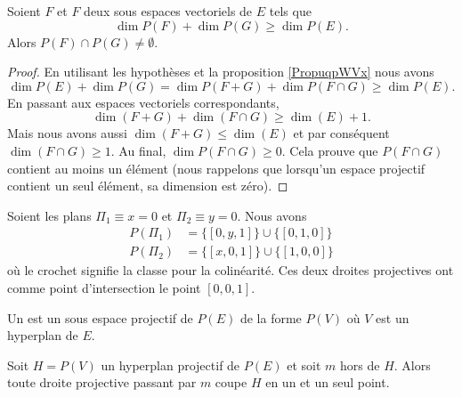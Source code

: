 \begin{theorem}[incidence]
    Soient \( F\) et \( F\) deux sous espaces vectoriels de \( E\) tels que 
    \begin{equation}
        \dim P(F)+\dim P(G)\geq \dim P(E).
    \end{equation}
    Alors \( P(F)\cap P(G)\neq \emptyset\).
\end{theorem}

\begin{proof}
    En utilisant les hypothèses et la proposition \ref{PropuqpWVx} nous avons
    \begin{equation}
        \dim P(E)+\dim P(G)=\dim P(F+G)+\dim P(F\cap G)\geq \dim P(E).
    \end{equation}
    En passant aux espaces vectoriels correspondants,
    \begin{equation}
        \dim(F+G)+\dim(F\cap G)\geq \dim(E)+1.
    \end{equation}
    Mais nous avons aussi \( \dim(F+G)\leq \dim(E)\) et par conséquent \( \dim(F\cap G)\geq 1\). Au final, \( \dim P(F\cap G)\geq 0\). Cela prouve que \( P(F\cap G)\) contient au moins un élément (nous rappelons que lorsqu'un espace projectif contient un seul élément, sa dimension est zéro).
\end{proof}

\begin{example}
    Soient les plans \( \Pi_1\equiv x=0\) et \( \Pi_2\equiv y=0\). Nous avons
    \begin{subequations}
        \begin{align}
            P(\Pi_1)&=\{ [0,y,1] \}\cup\{ [0,1,0] \}\\
            P(\Pi_2)&=\{ [x,0,1] \}\cup\{ [1,0,0] \}
        \end{align}
    \end{subequations}
    où le crochet signifie la classe pour la colinéarité. Ces deux droites projectives ont comme point d'intersection le point \( [0,0,1]\).
\end{example}

\begin{definition}
    Un  est un sous espace projectif de \( P(E)\) de la forme \( P(V)\) où \( V\) est un hyperplan de \( E\).
\end{definition}

\begin{proposition}
    Soit \( H=P(V)\) un hyperplan projectif de \( P(E)\) et soit \( m\) hors de \( H\). Alors toute droite projective passant par \( m\) coupe \( H\) en un et un seul point.
\end{proposition}

